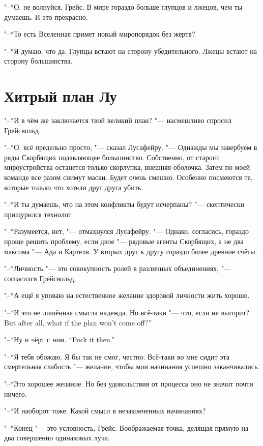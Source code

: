 "--*О, не волнуйся, Грейс.
В мире гораздо больше глупцов и лжецов, чем ты думаешь.
И это прекрасно.

"--*То есть Вселенная примет новый миропорядок без жертв?

"--*Я думаю, что да.
Глупцы встают на сторону убедительного.
Лжецы встают на сторону большинства.

\section{Хитрый план Лу}

"--*И в чём же заключается твой великий план? "--- насмешливо спросил Грейсвольд.

"--*О, всё предельно просто, "--- сказал Лусафейру.
"--- Однажды мы завербуем в ряды Скорбящих подавляющее большинство.
Собственно, от старого мироустройства останется только скорлупка, внешняя оболочка.
Затем по моей команде все разом снимут маски.
Будет очень смешно.
Особенно посмеются те, которые только что хотели друг друга убить.

"--*И ты думаешь, что на этом конфликты будут исчерпаны? "--- скептически прищурился технолог.

"--*Разумеется, нет, "--- отмахнулся Лусафейру.
"--- Однако, согласись, гораздо проще решить проблему, если двое "--- рядовые агенты Скорбящих, а не два максима "--- Ада и Картеля.
У вторых друг к другу гораздо более древние счёты.

"--*Личность "--- это совокупность ролей в различных объединениях, "--- согласился Грейсвольд.

"--*А ещё я уповаю на естественное желание здоровой личности жить хорошо.

"--*И это не лишённая смысла надежда.
{Но всё-таки "--- что, если не выгорит?}
{But after all, what if the plan won't come off?''}

{"--*Ну и чёрт с ним.}
{``Fuck it then.''}

"--*Я тебя обожаю.
Я бы так не смог, честно.
Всё-таки во мне сидит эта смертельная слабость "--- желание, чтобы мои начинания успешно заканчивались.

"--*Это хорошее желание.
Но без удовольствия от процесса оно не значит почти ничего.

"--*И наоборот тоже.
Какой смысл в незаконченных начинаниях?

"--*Конец "--- это условность, Грейс.
Воображаемая точка, делящая прямую на два совершенно одинаковых луча.

